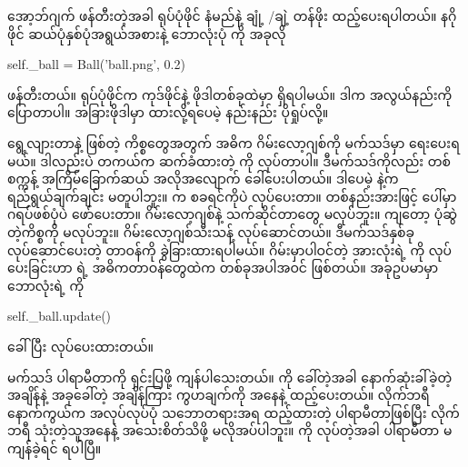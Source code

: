  အော့ဘ်ဂျက် ဖန်တီးတဲ့အခါ ရုပ်ပုံဖိုင် နံမည်နဲ့ ချုံ့ /ချဲ့ တန်ဖိုး  ထည့်ပေးရပါတယ်။ နဂို  ဖိုင်  ဆယ်ပုံနှစ်ပုံအရွယ်အစားနဲ့ ဘောလုံးပုံ  ကို အခုလို
%
\begin{py}
self._ball = Ball('ball.png', 0.2)
\end{py}
%
ဖန်တီးတယ်။  ရုပ်ပုံဖိုင်က ကုဒ်ဖိုင်နဲ့ ဖိုဒါတစ်ခုထဲမှာ ရှိရပါမယ်။ ဒါက အလွယ်နည်းကို ပြောတာပါ။ အခြားဖိုဒါမှာ ထားလို့ရပေမဲ့ နည်းနည်း ပိုရှုပ်လို့။

 ရွေ့လျားတာနဲ့  ဖြစ်တဲ့ ကိစ္စတွေအတွက် အဓိက ဂိမ်းလော့ဂျစ်ကို   မက်သဒ်မှာ ရေးပေးရမယ်။ ဒါလည်းပဲ တကယ်က ဆက်ခံထားတဲ့  ကို   လုပ်တာပါ။  ဒီမက်သဒ်ကိုလည်း တစ်စက္ကန့် အကြိမ်ခြောက်ဆယ် အလိုအလျောက် ခေါ်ပေးပါတယ်။ ဒါပေမဲ့  နဲ့က ရည်ရွယ်ချက်ချင်း မတူပါဘူး။  က စခရင်ကိုပဲ  လုပ်ပေးတာ။ တစ်နည်းအားဖြင့်  ပေါ်မှာ ဂရပ်ဖစ်ပုံပဲ ဖော်ပေးတာ။ ဂိမ်းလော့ဂျစ်နဲ့ သက်ဆိုင်တာတွေ မလုပ်ဘူး။  ကျတော့ ပုံဆွဲတဲ့ကိစ္စကို မလုပ်ဘူး။ ဂိမ်းလော့ဂျစ်သီးသန့် လုပ်ဆောင်တယ်။ ဒီမက်သဒ်နှစ်ခု လုပ်ဆောင်ပေးတဲ့ တာဝန်ကို ခွဲခြားထားရပါမယ်။ ဂိမ်းမှာပါဝင်တဲ့  အားလုံးရဲ့  ကို  လုပ်ပေးခြင်းဟာ  ရဲ့ အဓိကတာဝန်တွေထဲက တစ်ခုအပါအဝင် ဖြစ်တယ်။ အခုဥပမာမှာ ဘောလုံးရဲ့  ကို
%
\begin{py}
self._ball.update()
\end{py}
%
ခေါ်ပြီး  လုပ်ပေးထားတယ်။

 မက်သဒ်  ပါရာမီတာကို ရှင်းပြဖို့ ကျန်ပါသေးတယ်။  ကို ခေါ်တဲ့အခါ နောက်ဆုံးခါ်ခဲ့တဲ့ အချိန်နဲ့ အခုခေါ်တဲ့ အချိန်ကြား ကွဟချက်ကို  အနေနဲ့ ထည့်ပေးတယ်။  လိုက်ဘရီ နောက်ကွယ်က အလုပ်လုပ်ပုံ သဘောတရားအရ ထည့်ထားတဲ့ ပါရာမီတာဖြစ်ပြီး လိုက်ဘရီ သုံးတဲ့သူအနေနဲ့ အသေးစိတ်သိဖို့ မလိုအပ်ပါဘူး။  ကို  လုပ်တဲ့အခါ  ပါရာမီတာ မကျန်ခဲ့ရင် ရပါပြီ။

